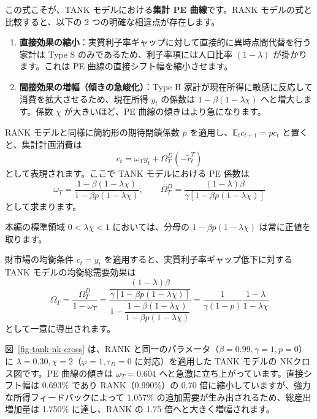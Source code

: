 \documentclass[
  japanese,
  lualatex,
  ja=standard,
  12pt,
  a4paper]{ltjsarticle}
\providecommand{\tightlist}{%
  \setlength{\itemsep}{0pt}\setlength{\parskip}{0pt}}
\begin{document}
この式こそが、TANK モデルにおける\textbf{集計 PE 曲線}です。RANK
モデルの式と比較すると、以下の 2 つの明確な相違点が存在します。

\begin{enumerate}
\def\labelenumi{\arabic{enumi}.}
\tightlist
\item
  \textbf{直接効果の縮小}：実質利子率ギャップに対して直接的に異時点間代替を行う家計は
  Type S のみであるため、利子率項には人口比率 \((1-\lambda)\)
  が掛かります。これは PE 曲線の直接シフト幅を縮小させます。
\item
  \textbf{間接効果の増幅（傾きの急峻化）}：Type H
  家計が現在所得に敏感に反応して消費を拡大させるため、現在所得 \(y_t\)
  の係数は \(1 - \beta(1 - \lambda\chi)\) へと増大します。係数 \(\chi\)
  が大きいほど、PE 曲線の傾きはより急になります。
\end{enumerate}

RANK モデルと同様に簡約形の期待閉鎖係数 \(p\)
を適用し、\(\mathbb{E}_t c_{t+1} = p c_t\) と置くと、集計計画消費は \[
c_t = \omega_T y_t + \Omega_T^D(-\widetilde{r}_t^T)
\] として表現されます。ここで TANK モデルにおける PE 係数は \[
\omega_T = \frac{1 - \beta(1 - \lambda\chi)}{1 - \beta p(1 - \lambda\chi)},
\qquad
\Omega_T^D = \frac{(1-\lambda)\beta}{\gamma[1 - \beta p(1 - \lambda\chi)]}
\] として求まります。

本編の標準領域 \(0 < \lambda\chi < 1\) においては、分母の
\(1 - \beta p(1 - \lambda\chi)\) は常に正値を取ります。

財市場の均衡条件 \(c_t = y_t\)
を適用すると、実質利子率ギャップ低下に対する TANK
モデルの均衡総需要効果は \[
\Omega_T
=
\frac{\Omega_T^D}{1 - \omega_T}
=
\frac{\dfrac{(1-\lambda)\beta}{\gamma[1 - \beta p(1 - \lambda\chi)]}}{1 - \dfrac{1 - \beta(1 - \lambda\chi)}{1 - \beta p(1 - \lambda\chi)}}
=
\frac{1}{\gamma(1-p)} \frac{1-\lambda}{1-\lambda\chi}
\] として一意に導出されます。


図~\ref{fig-tank-nk-cross} は、RANK
と同一のパラメータ（\(\beta=0.99, \gamma=1, p=0\)）に
\(\lambda=0.30, \chi=2\)（\(\varphi=1, \tau_D=0\) に対応）を適用した
TANK モデルの NKクロス図です。PE 曲線の傾きは \(\omega_T = 0.604\)
へと急激に立ち上がっています。直接シフト幅は 0.693\% であり
RANK（0.990\%）の 0.70
倍に縮小していますが、強力な所得フィードバックによって 1.057\%
の追加需要が生み出されるため、総産出増加量は 1.750\% に達し、RANK の
1.75 倍へと大きく増幅されます。
\end{document}
